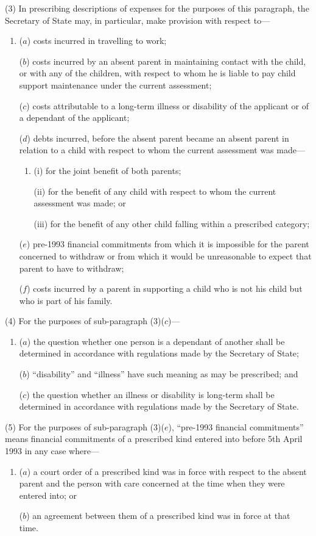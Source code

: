 \documentclass[12pt,a4paper]{article}
\begin{document}
(3) In prescribing descriptions of expenses for the purposes of this paragraph, the Secretary of State may, in particular, make provision with respect to—
\begin{enumerate}\item[]
($a$) costs incurred in travelling to work;

($b$) costs incurred by an absent parent in maintaining contact with the child, or with any of the children, with respect to whom he is liable to pay child support maintenance under the current assessment;

($c$) costs attributable to a long-term illness or disability of the applicant or of a dependant of the applicant;

($d$) debts incurred, before the absent parent became an absent parent in relation to a child with respect to whom the current assessment was made—
\begin{enumerate}\item[]
(i) for the joint benefit of both parents;

(ii) for the benefit of any child with respect to whom the current assessment was made; or

(iii) for the benefit of any other child falling within a prescribed category;
\end{enumerate}

($e$) pre-1993 financial commitments from which it is impossible for the parent concerned to withdraw or from which it would be unreasonable to expect that parent to have to withdraw;

($f$) costs incurred by a parent in supporting a child who is not his child but who is part of his family.
\end{enumerate}

(4) For the purposes of sub-paragraph (3)($c$)—
\begin{enumerate}\item[]
($a$) the question whether one person is a dependant of another shall be determined in accordance with regulations made by the Secretary of State;

($b$) “disability” and “illness” have such meaning as may be prescribed; and

($c$) the question whether an illness or disability is long-term shall be determined in accordance with regulations made by the Secretary of State.
\end{enumerate}

(5) For the purposes of sub-paragraph (3)($e$), “pre-1993 financial commitments” means financial commitments of a prescribed kind entered into before 5th April 1993 in any case where—
\begin{enumerate}\item[]
($a$) a court order of a prescribed kind was in force with respect to the absent parent and the person with care concerned at the time when they were entered into; or

($b$) an agreement between them of a prescribed kind was in force at that time.
\end{enumerate}
\end{document}

